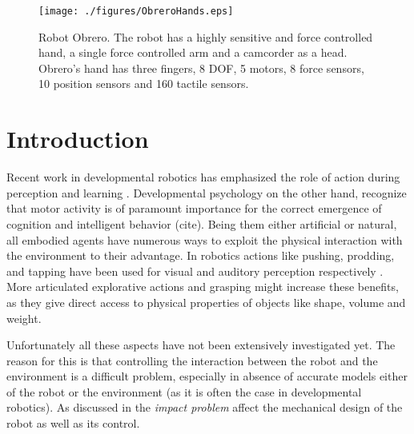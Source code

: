 \begin{figure}[tbp]
\centerline{
\texttt{[image: ./figures/ObreroHands.eps]}
} \caption{Robot Obrero. The robot has a highly sensitive and
force controlled hand, a single force controlled arm and a
camcorder as a head. Obrero's hand  has three fingers, 8 DOF, 5
motors, 8 force sensors, 10 position sensors and 160 tactile
sensors.} \label{fig:RobotObrero}
\end{figure}

\section{Introduction}

Recent work in developmental robotics has emphasized the role of
action during perception and learning \cite{metta03early}
\cite{natale04learning} \cite{natale05from}. Developmental
psychology on the other hand, recognize that motor activity is of
paramount importance for the correct emergence of cognition and
intelligent behavior (cite). Being them either artificial or
natural, all embodied agents have numerous ways to exploit the
physical interaction with the environment to their advantage. In
robotics actions like pushing, prodding, and tapping have been
used for visual and auditory perception respectively
\cite{metta03early} \cite{etorresjara05tapping}. More articulated explorative
actions and grasping might increase these benefits, as they give
direct access to physical properties of objects like shape, volume
and weight.


Unfortunately all these aspects have not been extensively investigated yet. The
reason for this is that controlling the interaction between the robot and
the environment is a difficult problem, especially in absence of accurate
models either of the robot or the environment (as it is often the case in
developmental robotics). As discussed in \cite{volpe90real} the
\emph{impact problem} affect the mechanical design of the robot as well as
its control.

